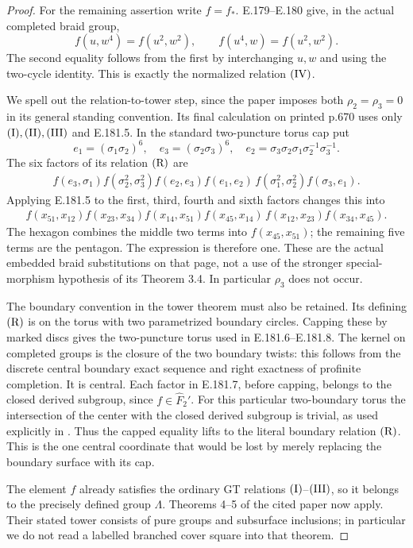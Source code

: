 \begin{proof}
For the remaining assertion write \(f=f_*\).
E.179--E.180 give, in the actual completed braid group,
\[
        f(u,w^4)=f(u^2,w^2),\qquad
        f(u^4,w)=f(u^2,w^2).
\tag{E.181.5}
\]
The second equality follows from the first by interchanging
\(u,w\) and using the two-cycle identity.  This is exactly
the normalized relation \(({\rm IV})\).

We spell out the relation-to-tower step, since the paper
\citet{LitSchneps2006Automorphisms} imposes both
\(\rho_2=\rho_3=0\) in its general standing convention.
Its final calculation on printed p.670 uses only
\(({\rm I}),({\rm II}),({\rm III})\) and E.181.5.
In the standard two-puncture torus cap put
\[
 e_1=(\sigma_1\sigma_2)^6,\quad
 e_3=(\sigma_2\sigma_3)^6,\quad
 e_2=\sigma_3\sigma_2\sigma_1\sigma_2^{-1}\sigma_3^{-1}.
\tag{E.181.6}
\]
The six factors of its relation \(({\rm R})\) are
\[
 \begin{split}
 f(e_3,\sigma_1) f(\sigma_2^2,\sigma_3^2)
 f(e_2,e_3) f(e_1,e_2)\,
 f(\sigma_1^2,\sigma_2^2) f(\sigma_3,e_1).
 \end{split}
\tag{E.181.7}
\]
Applying E.181.5 to the first, third, fourth and sixth factors
changes this into
\[
 \begin{split}
 f(x_{51},x_{12}) f(x_{23},x_{34}) f(x_{14},x_{51})
 f(x_{45},x_{14})\,
 f(x_{12},x_{23}) f(x_{34},x_{45}).
 \end{split}
\tag{E.181.8}
\]
The hexagon combines the middle two terms into
\(f(x_{45},x_{51})\); the remaining five terms are the pentagon.
The expression is therefore one.  These are the actual
embedded braid substitutions on that page, not a use of the
stronger special-morphism hypothesis of its Theorem 3.4.
In particular \(\rho_3\) does not occur.

The boundary convention in the tower theorem must also be
retained.  Its defining \(({\rm R})\) is on the torus with two
parametrized boundary circles.  Capping these by marked discs
gives the two-puncture torus used in E.181.6--E.181.8.
The kernel on completed groups is the closure of the two
boundary twists: this follows from the discrete central
boundary exact sequence and right exactness of profinite
completion.  It is central.  Each factor in E.181.7, before
capping, belongs to the closed derived subgroup, since
\(f\in\widehat F_2'\).
For this particular two-boundary torus the intersection of
the center with the closed derived subgroup is trivial,
as used explicitly in
\citet[Lemma 7, p.22]{LitHatcherLochakSchneps2000}.
Thus the capped equality lifts to the literal boundary
relation \(({\rm R})\).  This is the one central coordinate
that would be lost by merely replacing the boundary surface
with its cap.

The element \(f\) already satisfies the ordinary GT
relations \(({\rm I})\)--\(({\rm III})\), so it belongs
to the precisely defined group \(\Lambda\).
Theorems 4--5 of the cited paper now apply.
Their stated tower consists of pure groups and subsurface
inclusions; in particular we do not read a labelled branched
cover square into that theorem.
\end{proof}

